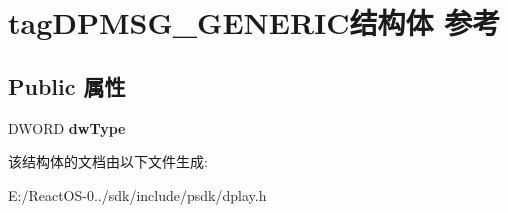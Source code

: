 \hypertarget{structtag_d_p_m_s_g___g_e_n_e_r_i_c}{}\section{tag\+D\+P\+M\+S\+G\+\_\+\+G\+E\+N\+E\+R\+I\+C结构体 参考}
\label{structtag_d_p_m_s_g___g_e_n_e_r_i_c}
\subsection*{Public 属性}
\begin{DoxyCompactItemize}
\item 
\mbox{\label{structtag_d_p_m_s_g___g_e_n_e_r_i_c_a3fb926b5eddaa22f1ceaf5e802ed388b}} 
D\+W\+O\+RD {\bfseries dw\+Type}
\end{DoxyCompactItemize}


该结构体的文档由以下文件生成\+:\begin{DoxyCompactItemize}
\item 
E\+:/\+React\+O\+S-\/0../sdk/include/psdk/dplay.\+h\end{DoxyCompactItemize}
